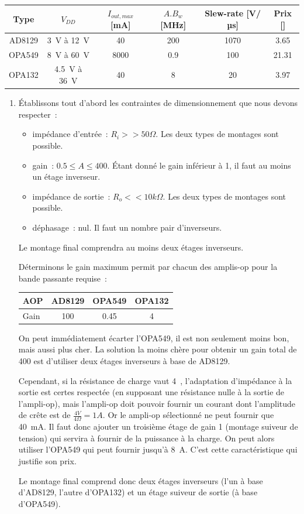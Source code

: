 \documentclass{../template/tp}
\begin{document}
{	\begin{center}
		\begin{tabular}{|c|c|c|c|c|c|} \hline
		Type & $V_{DD}$ & $I_{out, max}$ [mA] & $A.B_w$ [MHz] & Slew-rate [V/µs] & Prix [\EUR] \\ \hline
		AD8129 & 3~V à 12~V & 40 & 200 & 1070 & 3.65 \\ \hline %
		OPA549 & 8~V à 60~V & 8000 & 0.9 & 100 & 21.31 \\ \hline
		OPA132 & 4.5~V à 36~V & 40 & 8 & 20 & 3.97 \\ \hline
		\end{tabular}
	\end{center}
}
{
	\begin{enumerate}
		\item Établissons tout d'abord les contraintes de dimensionnement que nous devons respecter~:
		\begin{itemize}
			\item impédance d'entrée~: $R_i >> 50 \Omega$. Les deux types de montages sont possible.
			\item gain~: $0.5 \leq A \leq 400$. Étant donné le gain inférieur à 1, il faut au moins un étage inverseur.
			\item impédance de sortie~: $R_o << 10 k\Omega$. Les deux types de montages sont possible.
			\item déphasage~: nul. Il faut un nombre pair d'inverseurs.
		\end{itemize}

		Le montage final comprendra au moins deux étages inverseurs.

		Déterminons le gain maximum permit par chacun des amplis-op pour la bande passante requise~:

		\begin{center}
			\begin{tabular}{l|c|c|c}
			AOP & AD8129 & OPA549 & OPA132 \\ \hline
			Gain & 100 & 0.45 & 4 \\
			\end{tabular}
		\end{center}

		On peut immédiatement écarter l'OPA549, il est non seulement moins bon, mais aussi plus cher.
		La solution la moins chère pour obtenir un gain total de 400 est d'utiliser deux étages inverseurs à base de AD8129.

		Cependant, si la résistance de charge vaut 4~\ohm, l'adaptation d'impédance à la sortie est certes respectée (en supposant une résistance nulle à la sortie de l'ampli-op), mais l'ampli-op doit pouvoir fournir un courant dont l'amplitude de crête est de $\frac{4V}{4\Omega} = 1 A$.
		Or le ampli-op sélectionné ne peut fournir que 40~mA.
		Il faut donc ajouter un troisième étage de gain 1 (montage suiveur de tension) qui servira à fournir de la puissance à la charge.
		On peut alors utiliser l'OPA549 qui peut fournir jusqu'à 8~A.
		C'est cette caractéristique qui justifie son prix.

		Le montage final comprend donc deux étages inverseurs (l'un à base d'AD8129, l'autre d'OPA132) et un étage suiveur de sortie (à base d'OPA549).
	\end{enumerate}
}
\end{document}
